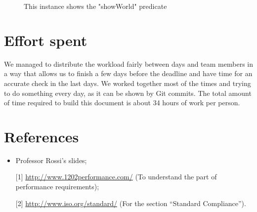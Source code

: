\documentclass[12pt,titlepage]{article}
\begin{document}
\begin{landscape}
\newpage
\begin{figure}[h]
\caption{This instance shows the "showWorld" predicate}
\end{figure}
\clearpage
\end{landscape}

\pagebreak
\pagebreak
\pagebreak
\section{Effort spent}\label{sec:crit}
We managed to distribute the workload fairly between days and team members in a way that allows us to finish a few days before the deadline and have time for an accurate check in the last days.
We worked together most of the times and trying to do something every day, as it can be shown by Git commits.
The total amount of time required to build this document is about 34 hours of work per person.
\pagebreak

\section{References}\label{sec:crit}
\begin{itemize}
\item Professor Rossi's slides;
\item [{[1]}] \url{http://www.1202performance.com/} (To understand the part of performance requirements);
\item [{[2]}] \url{http://www.iso.org/standard/} (For the section ``Standard Compliance'').
\end{itemize}
\end{document}
